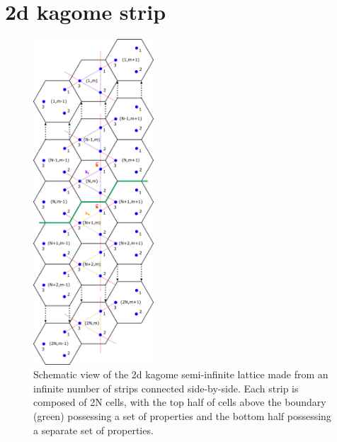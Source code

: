 \section{2d kagome strip}

\begin{figure}[!h]
\centering
\includegraphics[width=0.4\textwidth]{imgs/kagomestripmodel.png}
\caption{\label{fig:kagomestripmodel} Schematic view of the 2d kagome
  semi-infinite lattice made from an infinite number of strips connected
  side-by-side. Each strip is composed of 2N cells, with the top half of cells
  above the boundary (green) possessing a set of properties and the bottom half
  possessing a separate set of properties.}
\end{figure}
